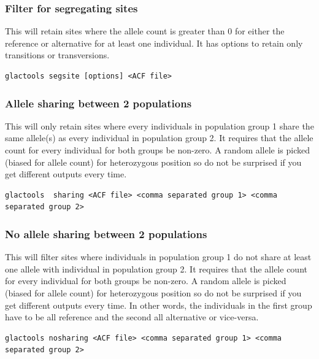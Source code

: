 \documentclass[a4paper]{article}
\begin{document}
\subsubsection{Filter for segregating sites}

\noindent This will retain sites where the allele count is greater than 0 for either the reference or alternative for at least one individual. It has options to retain only transitions or transversions. 

\begin{lstlisting}
glactools segsite [options] <ACF file>
\end{lstlisting}

\subsubsection{Allele sharing between 2 populations}

\noindent This will only retain sites where every individuals in population group 1 share the same allele(s) as every individual in population group 2.
It requires that the allele count for every individual for both groups be non-zero.
A random allele is picked (biased for allele count) for heterozygous position so do not be surprised if you get different outputs every time.

\tiny
\begin{lstlisting}
glactools  sharing <ACF file> <comma separated group 1> <comma separated group 2>
\end{lstlisting}
\normalsize

\subsubsection{No allele sharing between 2 populations}

\noindent This will filter sites where individuals in population group 1 do not share at least one allele with individual in population group 2.
It requires that the allele count for every individual for both groups be non-zero.
A random allele is picked (biased for allele count) for heterozygous position so do not be surprised if you get different outputs every time.
In other words, the individuals in the first group have to be all reference and the second all alternative or vice-versa.

\tiny
\begin{lstlisting}
glactools nosharing <ACF file> <comma separated group 1> <comma separated group 2>
\end{lstlisting}
\normalsize
\end{document}
